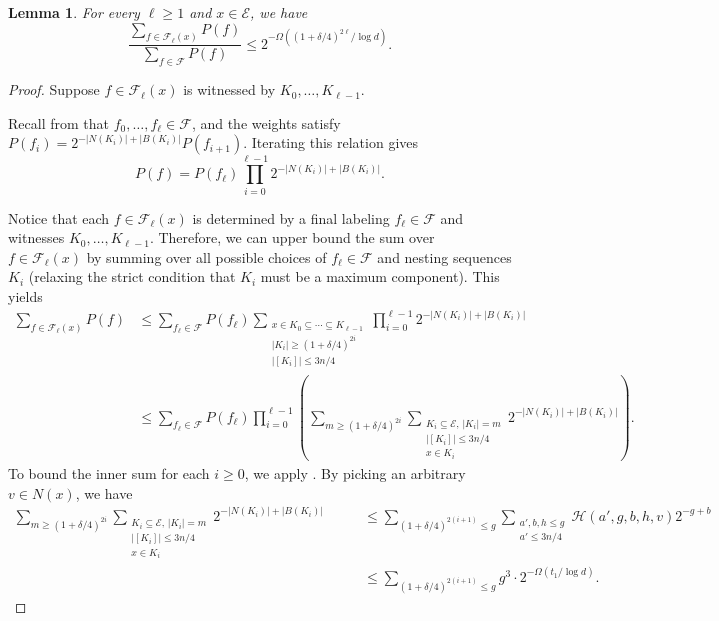 \documentclass{amsart}
\newtheorem{lem}[thm]{Lemma}
\theoremstyle{definition}
\newcommand{\cE}{\mathcal{E} }
\newcommand{\gd}[0]{\delta }
\newcommand{\sub}[0]{\subseteq}
\newcommand{\0}[0]{\emptyset}
\begin{document}
\begin{lem}\label{lem:almost-all-good-spectral}
For every $\ell\geq 1$ and $x\in \cE$, we have
\[
\frac{\sum_{f\in\mathcal{F}_{\ell}(x)}P(f)}{\sum_{f\in\mathcal{F}}P(f)}\leq 2^{-\Omega((1+\delta/4)^{2\ell}/\log d)}.
\]
\end{lem}

\begin{proof}
Suppose $f\in\mathcal{F}_\ell(x)$ is witnessed by $K_0,\dots,K_{\ell-1}$. 

Recall from  that $f_0,\dots,f_\ell \in\mathcal{F}$, and the weights satisfy $P(f_i) = 2^{-|N(K_i)|+|B(K_i)|} P(f_{i+1})$.
Iterating this relation gives
\[
P(f) = P(f_\ell) \prod_{i=0}^{\ell-1} 2^{-|N(K_i)|+|B(K_i)|}.
\]

Notice that each $f \in \mathcal{F}_\ell(x)$ is determined by a final labeling $f_\ell \in \mathcal{F}$ and witnesses $K_0, \dots, K_{\ell-1}$. Therefore, we can upper bound the sum over $f \in \mathcal{F}_\ell(x)$ by summing over all possible choices of $f_\ell \in \mathcal{F}$ and nesting sequences $K_i$ (relaxing the strict condition that $K_i$ must be a maximum component). This yields
\begin{align*}
    \sum_{f\in\mathcal{F}_{\ell}(x)}P(f)
    &\leq \sum_{f_\ell\in \mathcal{F}}P(f_\ell)\sum_{\substack{x \in K_0 \sub \cdots  \sub K_{\ell-1} \\ |K_i| \ge (1+\gd/4)^{2i}\\ |[K_{i}]|\le 3n/4}}\prod_{i=0}^{\ell-1} 2^{-|N(K_i)|+|B(K_i)|} \\
    &\leq \sum_{f_\ell\in \mathcal{F}}P(f_\ell) \prod_{i=0}^{\ell-1}\left(\sum_{m\geq (1+\delta/4)^{2i}}\sum_{\substack{K_i\subseteq\cE,\,|K_i|=m\\|[K_i]|\leq 3n/4 \\ x\in K_i}}2^{-|N(K_i)|+|B(K_i)|}\right).
\end{align*}
To bound the inner sum for each $i \geq 0$, we apply . By picking an arbitrary $v \in N(x)$, we have
\begin{align*}
    \sum_{m\geq (1+\delta/4)^{2i}}\sum_{\substack{K_i\subseteq\cE,\,|K_i|=m\\|[K_i]|\leq 3n/4 \\ x\in K_i}}2^{-|N(K_i)|+|B(K_i)|}
    &\qquad \leq \sum_{(1+\delta/4)^{2(i+1)}\leq g}\sum_{\substack{a',b,h\leq g \\ a' \le 3n/4}}\mathcal{H}(a',g,b,h,v)2^{-g+b}\\
    &\qquad \leq \sum_{(1+\delta/4)^{2(i+1)}\leq g} g^3\cdot 2^{-\Omega(t_1/\log d)}. \end{align*}

\end{proof}
\end{document}
